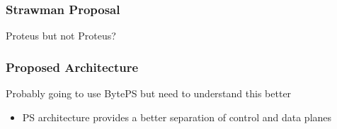   \begin{frame}
    \frametitle{Strawman Proposal}

    Proteus but not Proteus?

  \end{frame}

  \begin{frame}
    \frametitle{Proposed Architecture}

    Probably going to use BytePS but need to understand this better
    \begin{itemize}
      \item PS architecture provides a better separation of control and data planes
    \end{itemize}

  \end{frame}



